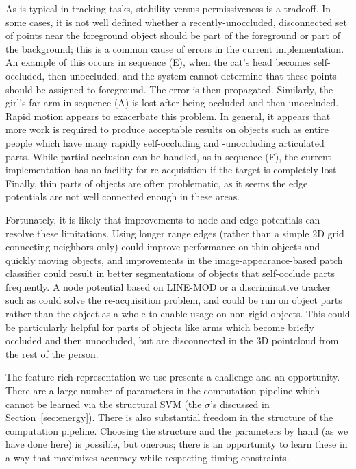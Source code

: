 \documentclass[graybox]{svmult}
\begin{document}
As is typical in tracking tasks, stability versus permissiveness is a tradeoff.  In some cases, it is not well defined whether a recently-unoccluded, disconnected set of points near the foreground object should be part of the foreground or part of the background; this is a common cause of errors in the current implementation.  An example of this occurs in sequence (E), when the cat's head becomes self-occluded, then unoccluded, and the system cannot determine that these points should be assigned to foreground.  The error is then propagated.  Similarly, the girl's far arm in sequence (A) is lost after being occluded and then unoccluded.  Rapid motion appears to exacerbate this problem.  In general, it appears that more work is required to produce acceptable results on objects such as entire people which have many rapidly self-occluding and -unoccluding articulated parts.  While partial occlusion can be handled, as in sequence (F), the current implementation has no facility for re-acquisition if the target is completely lost.  Finally, thin parts of objects are often problematic, as it seems the edge potentials are not well connected enough in these areas.

Fortunately, it is likely that improvements to node and edge potentials can resolve these limitations.  Using longer range edges (rather than a simple 2D grid connecting neighbors only) could improve performance on thin objects and quickly moving objects, and improvements in the image-appearance-based patch classifier could result in better segmentations of objects that self-occlude parts frequently.  A node potential based on LINE-MOD or a discriminative tracker such as \cite{kalal2010a} could solve the re-acquisition problem, and could be run on object parts rather than the object as a whole to enable usage on non-rigid objects.  This could be particularly helpful for parts of objects like arms which become briefly occluded and then unoccluded, but are disconnected in the 3D pointcloud from the rest of the person.

The feature-rich representation we use presents a challenge and an opportunity.  There are a large number of parameters in the computation pipeline which cannot be learned via the structural SVM (\eg the $\sigma$'s discussed in Section~\ref{sec:energy}). There is also substantial freedom in the structure of the computation pipeline.  Choosing the structure and the parameters by hand (as we have done here) is possible, but onerous; there is an opportunity to learn these in a way that maximizes accuracy while respecting timing constraints.
\end{document}

